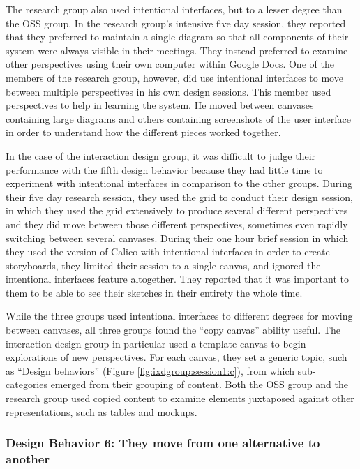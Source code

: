 The research group also used intentional interfaces, but to a lesser degree than the OSS group. In the research group's intensive five day session, they reported that they preferred to maintain a single diagram so that all components of their system were always visible in their meetings. They instead preferred to examine other perspectives using their own computer within Google Docs. One of the members of the research group, however, did use intentional interfaces to move between multiple perspectives in his own design sessions. This member used perspectives to help in learning the system. He moved between canvases containing large diagrams and others containing screenshots of the user interface in order to understand how the different pieces worked together. 

In the case of the interaction design group, it was difficult to judge their performance with the fifth design behavior because they had little time to experiment with intentional interfaces in comparison to the other groups. During their five day research session, they used the grid to conduct their design session, in which they used the grid extensively to produce several different perspectives and they did move between those different perspectives, sometimes even rapidly switching between several canvases. During their one hour brief session in which they used the version of Calico with intentional interfaces in order to create storyboards, they limited their session to a single canvas, and ignored the intentional interfaces feature altogether. They reported that it was important to them to be able to see their sketches in their entirety the whole time. 

While the three groups used intentional interfaces to different degrees for moving between canvases, all three groups found the ``copy canvas'' ability useful. The interaction design group in particular used a template canvas to begin explorations of new perspectives. For each canvas, they set a generic topic, such as ``Design behaviors'' (Figure \ref{fig:ixdgroup:session1:c}), from which sub-categories emerged from their grouping of content. Both the OSS group and the research group used copied content to examine elements juxtaposed against other representations, such as tables and mockups.


\subsubsection{Design Behavior 6: They move from one alternative to another}

